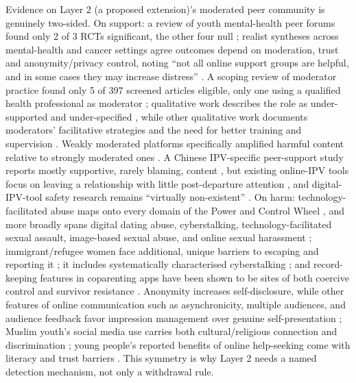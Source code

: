 Evidence on Layer 2 (a proposed extension)'s moderated peer community is genuinely two-sided. On support: a review of youth mental-health peer forums found only 2 of 3 RCTs significant, the other four null \cite{ref139}; realist syntheses across mental-health and cancer settings agree outcomes depend on moderation, trust and anonymity/privacy control, noting ``not all online support groups are helpful, and in some cases they may increase distress'' \cite{ref140,ref141,ref146}. A scoping review of moderator practice found only 5 of 397 screened articles eligible, only one using a qualified health professional as moderator \cite{ref142}; qualitative work describes the role as under-supported and under-specified \cite{ref143}, while other qualitative work documents moderators' facilitative strategies and the need for better training and supervision \cite{ref144}. Weakly moderated platforms specifically amplified harmful content relative to strongly moderated ones \cite{ref145}. A Chinese IPV-specific peer-support study reports mostly supportive, rarely blaming, content \cite{ref147}, but existing online-IPV tools focus on leaving a relationship with little post-departure attention \cite{ref148}, and digital-IPV-tool safety research remains ``virtually non-existent'' \cite{ref137}. On harm: technology-facilitated abuse maps onto every domain of the Power and Control Wheel \cite{ref149}, and more broadly spans digital dating abuse, cyberstalking, technology-facilitated sexual assault, image-based sexual abuse, and online sexual harassment \cite{ref150}; immigrant/refugee women face additional, unique barriers to escaping and reporting it \cite{ref151}; it includes systematically characterised cyberstalking \cite{ref152}; and record-keeping features in coparenting apps have been shown to be sites of both coercive control and survivor resistance \cite{ref153}. Anonymity increases self-disclosure, while other features of online communication such as asynchronicity, multiple audiences, and audience feedback favor impression management over genuine self-presentation \cite{ref154}; Muslim youth's social media use carries both cultural/religious connection and discrimination \cite{ref157}; young people's reported benefits of online help-seeking come with literacy and trust barriers \cite{ref156}. This symmetry is why Layer 2 needs a named detection mechanism, not only a withdrawal rule.

